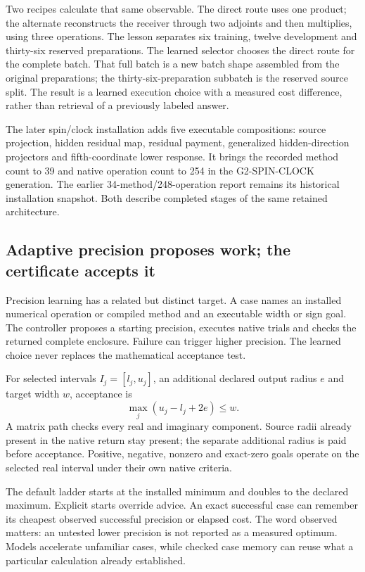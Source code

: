 Two recipes calculate that same observable. The direct route uses one product; the alternate reconstructs the receiver through two adjoints and then multiplies, using three operations. The lesson separates six training, twelve development and thirty-six reserved preparations. The learned selector chooses the direct route for the complete batch. That full batch is a new batch shape assembled from the original preparations; the thirty-six-preparation subbatch is the reserved source split. The result is a learned execution choice with a measured cost difference, rather than retrieval of a previously labeled answer.

The later spin/clock installation adds five executable compositions: source projection, hidden residual map, residual payment, generalized hidden-direction projectors and fifth-coordinate lower response. It brings the recorded method count to 39 and native operation count to 254 in the G2-SPIN-CLOCK generation. The earlier 34-method/248-operation report remains its historical installation snapshot. Both describe completed stages of the same retained architecture.

\subsection{Adaptive precision proposes work; the certificate accepts it}
\label{v3-runtime-precision}

Precision learning has a related but distinct target. A case names an installed numerical operation or compiled method and an executable width or sign goal. The controller proposes a starting precision, executes native trials and checks the returned complete enclosure. Failure can trigger higher precision. The learned choice never replaces the mathematical acceptance test.

For selected intervals $I_j=[l_j,u_j]$, an additional declared output radius $e$ and target width $w$, acceptance is
\[
 \max_j(u_j-l_j+2e)\leq w.
\]
A matrix path checks every real and imaginary component. Source radii already present in the native return stay present; the separate additional radius is paid before acceptance. Positive, negative, nonzero and exact-zero goals operate on the selected real interval under their own native criteria.

The default ladder starts at the installed minimum and doubles to the declared maximum. Explicit starts override advice. An exact successful case can remember its cheapest observed successful precision or elapsed cost. The word observed matters: an untested lower precision is not reported as a measured optimum. Models accelerate unfamiliar cases, while checked case memory can reuse what a particular calculation already established.

